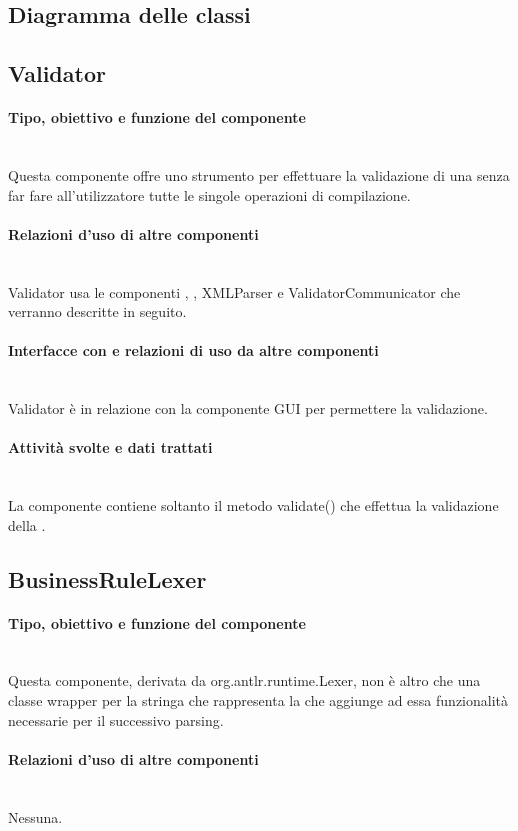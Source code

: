 \documentclass[11pt,titlepage,a4paper]{report}
\begin{document}
\subsection{Diagramma delle classi}
\subsection{Validator}%
\paragraph{Tipo, obiettivo e funzione del componente}\\
Questa componente offre uno strumento per effettuare la validazione di una \br senza far fare all'utilizzatore tutte le singole operazioni di compilazione.
\paragraph{Relazioni d'uso di altre componenti}\\
Validator usa le componenti \brp, \brl, XMLParser e ValidatorCommunicator che verranno descritte in seguito.
\paragraph{Interfacce con e relazioni di uso da altre componenti}\\
Validator \`e in relazione con la componente GUI per permettere la validazione.
\paragraph{Attivit\`a svolte e dati trattati}\\
La componente contiene soltanto il metodo validate() che effettua la validazione della \br.

\subsection{BusinessRuleLexer}
\paragraph{Tipo, obiettivo e funzione del componente}\\
Questa componente, derivata da org.antlr.runtime.Lexer, non \`e altro che una classe wrapper per la stringa che rappresenta la \br che aggiunge ad essa funzionalit\`a necessarie per il successivo parsing.
\paragraph{Relazioni d'uso di altre componenti}\\
Nessuna.
\end{document}
